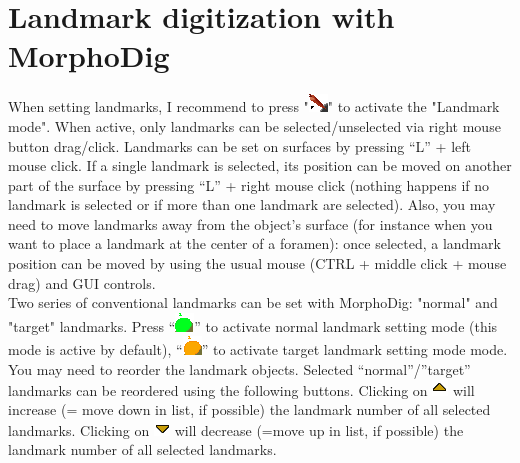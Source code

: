 \documentclass[12pt, a4paper]{book}
\begin{document}
\section{Landmark digitization with MorphoDig}
When setting landmarks, I recommend to press "\includegraphics[scale=0.7]{../images/04/Landmarks2.png}" to activate the "Landmark mode". When active,
only landmarks can be selected/unselected via right mouse button drag/click. Landmarks can be set
on surfaces by pressing “L” + left mouse click. If a single landmark is selected, its position can be moved
on another part of the surface by pressing “L” + right mouse click (nothing happens if no landmark
is selected or if more than one landmark are selected). Also, you may need to move landmarks away
from the object’s surface (for instance when you want to place a landmark at the center of a foramen):
once selected, a landmark position can be moved by using the usual mouse (CTRL + middle click + mouse drag) and GUI controls.\\

Two series of conventional landmarks can be set with MorphoDig: "normal" and "target" landmarks.
Press “\includegraphics[scale=0.7]{../images/04/normal_landmarks.png}” to activate normal landmark setting mode (this mode is active by default), “\includegraphics[scale=0.7]{../images/04/target_landmarks.png}” to activate target landmark setting mode mode.
You may need to reorder the landmark objects. 
Selected “normal”/”target” landmarks can be reordered
using the following buttons. Clicking on \includegraphics[scale=0.7]{../images/06/objects/move_up.png} will increase (= move down in list, if possible) the landmark number of all selected landmarks. Clicking on \includegraphics[scale=0.7]{../images/06/objects/move_down.png} will decrease (=move up in list, if possible) the landmark number of all selected landmarks. 
\end{document}
